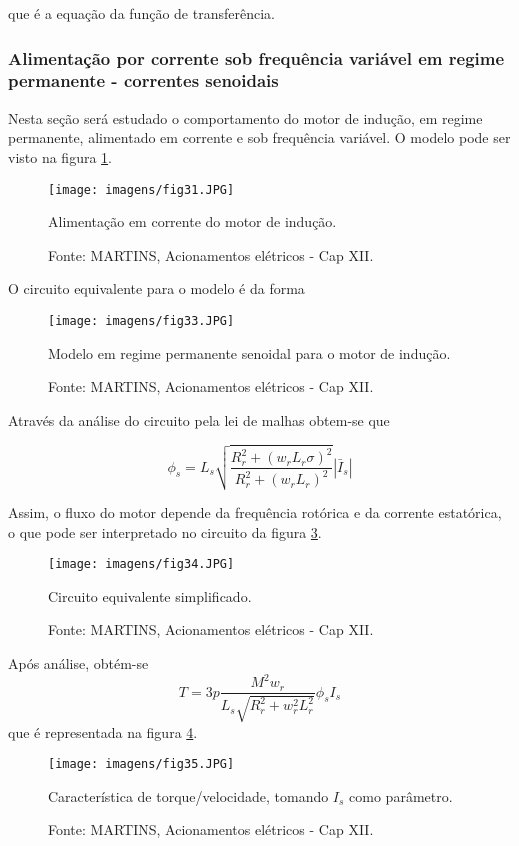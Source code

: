 que é a equação da função de transferência.

\subsubsection{Alimentação por corrente sob frequência variável em regime permanente - correntes senoidais}

Nesta seção será estudado o comportamento do motor de indução, em regime permanente, alimentado em corrente  e sob frequência variável. O modelo pode ser visto na figura \ref{fig:fig31}.

\begin{figure}[ht!]
\center
\texttt{[image: imagens/fig31.JPG]}
\caption{\label{fig:fig31}Alimentação em corrente do motor de indução.}
\caption*{Fonte: MARTINS, Acionamentos elétricos - Cap XII.}
\end{figure}

O circuito equivalente para o modelo é da forma

\begin{figure}[ht!]
\center
\texttt{[image: imagens/fig33.JPG]}
\caption{\label{fig:fig33}Modelo em regime permanente senoidal para o motor de indução.}
\caption*{Fonte: MARTINS, Acionamentos elétricos - Cap XII.}
\end{figure}

Através da análise do circuito pela lei de malhas obtem-se que

\[ \phi _{s} = L_{s}\sqrt{\frac{R_{r}^2+(w_{r}L_{r}\sigma )^2}{R_{r}^2+(w_{r}L_{r} )^2}}\left | \bar{I}_{s} \right | \]

Assim, o fluxo do motor depende da frequência rotórica e da corrente estatórica, o que pode ser interpretado no circuito da figura \ref{fig:fig34}.

\begin{figure}[ht!]
\center
\texttt{[image: imagens/fig34.JPG]}
\caption{\label{fig:fig34}Circuito equivalente simplificado.}
\caption*{Fonte: MARTINS, Acionamentos elétricos - Cap XII.}
\end{figure}

Após análise, obtém-se
\[ T=3p\frac{M^2w_r}{L_s\sqrt{R_r^2+w_r^2L_r^2}}\phi _sI_s  \]
que é representada na figura \ref{fig:fig35}.

\begin{figure}[ht!]
\center
\texttt{[image: imagens/fig35.JPG]}
\caption{\label{fig:fig35}Característica de torque/velocidade, tomando $ I_s $ como parâmetro.}
\caption*{Fonte: MARTINS, Acionamentos elétricos - Cap XII.}
\end{figure}


